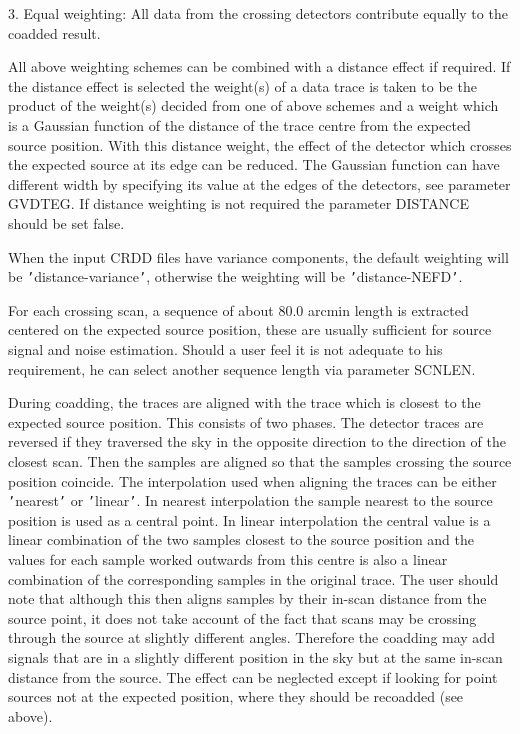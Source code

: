 \documentclass[11pt,nolof,noabs]{starlink}
\begin{document}
\begin{small}
{{      3. Equal weighting: All data from the crossing detectors
         contribute equally to the coadded result.

      All above weighting schemes can be combined with a distance effect
      if required. If the distance effect is selected the weight(s) of a
      data trace is taken to be the product of the weight(s) decided
      from one of above schemes and a weight which is a Gaussian function
      of the distance of the trace centre from the expected source position.
      With this distance weight, the effect of the detector which crosses
      the expected source at its edge can be reduced. The Gaussian function
      can have different width by specifying its value at the edges of the
      detectors, see parameter GVDTEG. If distance weighting is not required
      the parameter DISTANCE should be set false.

      When the input CRDD files have variance components, the default
      weighting will be \texttt{'}distance-variance\texttt{'}, otherwise the weighting
      will be \texttt{'}distance-NEFD\texttt{'}.

      For each crossing scan, a sequence of about 80.0 arcmin length is
      extracted centered on the expected source position, these are usually
      sufficient for source signal and noise estimation. Should a user feel
      it is not adequate to his requirement, he can select another
      sequence length via parameter SCNLEN.

      During coadding, the traces are aligned with the trace which is
      closest to the expected source position. This consists of two phases.
      The detector traces are reversed if they traversed the sky in the
      opposite direction to the direction of the closest scan. Then the
      samples are aligned so that the samples crossing the source position
      coincide. The interpolation used when aligning the traces can be either
      \texttt{'}nearest\texttt{'} or \texttt{'}linear\texttt{'}. In nearest interpolation the sample nearest to
      the source position is used as a central point. In linear interpolation
      the central value is a linear combination of the two samples closest
      to the source position and the values for each sample worked outwards
      from this centre is also a linear combination of the corresponding samples
      in the original trace. The user should note that although this then
      aligns samples by their in-scan distance from the source point, it does
      not take account of the fact that scans may be crossing through the source
      at slightly different angles. Therefore the coadding may add signals that
      are in a slightly different position in the sky but at the same in-scan
      distance from the source. The effect can be neglected except if looking
      for point sources not at the expected position, where they should be
      recoadded (see above).

}}
\end{small}
\end{document}
